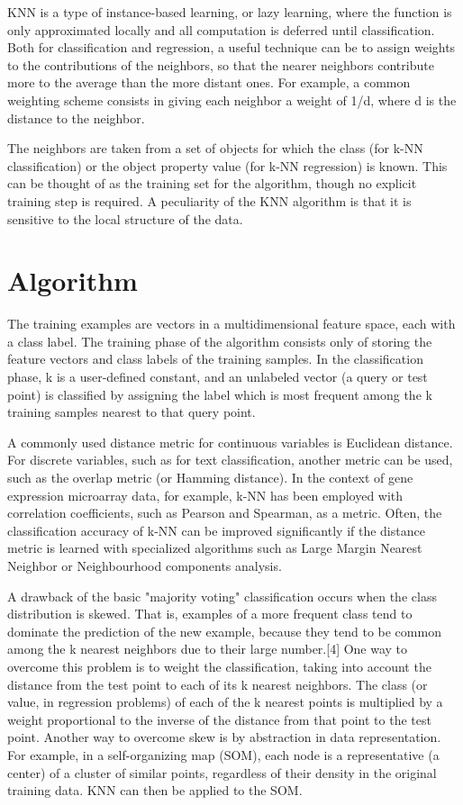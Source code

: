 \documentclass{report}
\begin{document}
KNN is a type of instance-based learning, or lazy learning, where the function is only approximated locally and all computation is deferred until classification.
Both for classification and regression, a useful technique can be to assign weights to the contributions of the neighbors, so that the nearer neighbors contribute more to the average than the more distant ones. For example, a common weighting scheme consists in giving each neighbor a weight of 1/d, where d is the distance to the neighbor.
 
The neighbors are taken from a set of objects for which the class (for k-NN classification) or the object property value (for k-NN regression) is known. This can be thought of as the training set for the algorithm, though no explicit training step is required.
A peculiarity of the KNN algorithm is that it is sensitive to the local structure of the data.

\section{Algorithm}
The training examples are vectors in a multidimensional feature space, each with a class label. The training phase of the algorithm consists only of storing the feature vectors and class labels of the training samples.
In the classification phase, k is a user-defined constant, and an unlabeled vector (a query or test point) is classified by assigning the label which is most frequent among the k training samples nearest to that query point.

A commonly used distance metric for continuous variables is Euclidean distance. For discrete variables, such as for text classification, another metric can be used, such as the overlap metric (or Hamming distance). In the context of gene expression microarray data, for example, k-NN has been employed with correlation coefficients, such as Pearson and Spearman, as a metric. Often, the classification accuracy of k-NN can be improved significantly if the distance metric is learned with specialized algorithms such as Large Margin Nearest Neighbor or Neighbourhood components analysis.

A drawback of the basic "majority voting" classification occurs when the class distribution is skewed. That is, examples of a more frequent class tend to dominate the prediction of the new example, because they tend to be common among the k nearest neighbors due to their large number.[4] One way to overcome this problem is to weight the classification, taking into account the distance from the test point to each of its k nearest neighbors. The class (or value, in regression problems) of each of the k nearest points is multiplied by a weight proportional to the inverse of the distance from that point to the test point. Another way to overcome skew is by abstraction in data representation. For example, in a self-organizing map (SOM), each node is a representative (a center) of a cluster of similar points, regardless of their density in the original training data. KNN can then be applied to the SOM.
\end{document}
